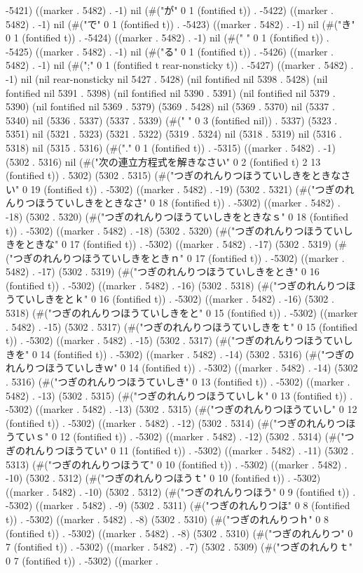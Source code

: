 -5421) ((marker . 5482) . -1) nil (#("が" 0 1 (fontified t)) . -5422) ((marker . 5482) . -1) nil (#("で" 0 1 (fontified t)) . -5423) ((marker . 5482) . -1) nil (#("き" 0 1 (fontified t)) . -5424) ((marker . 5482) . -1) nil (#("
" 0 1 (fontified t)) . -5425) ((marker . 5482) . -1) nil (#("る" 0 1 (fontified t)) . -5426) ((marker . 5482) . -1) nil (#(";" 0 1 (fontified t rear-nonsticky t)) . -5427) ((marker . 5482) . -1) nil (nil rear-nonsticky nil 5427 . 5428) (nil fontified nil 5398 . 5428) (nil fontified nil 5391 . 5398) (nil fontified nil 5390 . 5391) (nil fontified nil 5379 . 5390) (nil fontified nil 5369 . 5379) (5369 . 5428) nil (5369 . 5370) nil (5337 . 5340) nil (5336 . 5337) (5337 . 5339) (#("   " 0 3 (fontified nil)) . 5337) (5323 . 5351) nil (5321 . 5323) (5321 . 5322) (5319 . 5324) nil (5318 . 5319) nil (5316 . 5318) nil (5315 . 5316) (#("." 0 1 (fontified t)) . -5315) ((marker . 5482) . -1) (5302 . 5316) nil (#("次の連立方程式を解きなさい" 0 2 (fontified t) 2 13 (fontified t)) . 5302) (5302 . 5315) (#("つぎのれんりつほうていしきをときなさい" 0 19 (fontified t)) . -5302) ((marker . 5482) . -19) (5302 . 5321) (#("つぎのれんりつほうていしきをときなさ" 0 18 (fontified t)) . -5302) ((marker . 5482) . -18) (5302 . 5320) (#("つぎのれんりつほうていしきをときなｓ" 0 18 (fontified t)) . -5302) ((marker . 5482) . -18) (5302 . 5320) (#("つぎのれんりつほうていしきをときな" 0 17 (fontified t)) . -5302) ((marker . 5482) . -17) (5302 . 5319) (#("つぎのれんりつほうていしきをときｎ" 0 17 (fontified t)) . -5302) ((marker . 5482) . -17) (5302 . 5319) (#("つぎのれんりつほうていしきをとき" 0 16 (fontified t)) . -5302) ((marker . 5482) . -16) (5302 . 5318) (#("つぎのれんりつほうていしきをとｋ" 0 16 (fontified t)) . -5302) ((marker . 5482) . -16) (5302 . 5318) (#("つぎのれんりつほうていしきをと" 0 15 (fontified t)) . -5302) ((marker . 5482) . -15) (5302 . 5317) (#("つぎのれんりつほうていしきをｔ" 0 15 (fontified t)) . -5302) ((marker . 5482) . -15) (5302 . 5317) (#("つぎのれんりつほうていしきを" 0 14 (fontified t)) . -5302) ((marker . 5482) . -14) (5302 . 5316) (#("つぎのれんりつほうていしきｗ" 0 14 (fontified t)) . -5302) ((marker . 5482) . -14) (5302 . 5316) (#("つぎのれんりつほうていしき" 0 13 (fontified t)) . -5302) ((marker . 5482) . -13) (5302 . 5315) (#("つぎのれんりつほうていしｋ" 0 13 (fontified t)) . -5302) ((marker . 5482) . -13) (5302 . 5315) (#("つぎのれんりつほうていし" 0 12 (fontified t)) . -5302) ((marker . 5482) . -12) (5302 . 5314) (#("つぎのれんりつほうていｓ" 0 12 (fontified t)) . -5302) ((marker . 5482) . -12) (5302 . 5314) (#("つぎのれんりつほうてい" 0 11 (fontified t)) . -5302) ((marker . 5482) . -11) (5302 . 5313) (#("つぎのれんりつほうて" 0 10 (fontified t)) . -5302) ((marker . 5482) . -10) (5302 . 5312) (#("つぎのれんりつほうｔ" 0 10 (fontified t)) . -5302) ((marker . 5482) . -10) (5302 . 5312) (#("つぎのれんりつほう" 0 9 (fontified t)) . -5302) ((marker . 5482) . -9) (5302 . 5311) (#("つぎのれんりつほ" 0 8 (fontified t)) . -5302) ((marker . 5482) . -8) (5302 . 5310) (#("つぎのれんりつｈ" 0 8 (fontified t)) . -5302) ((marker . 5482) . -8) (5302 . 5310) (#("つぎのれんりつ" 0 7 (fontified t)) . -5302) ((marker . 5482) . -7) (5302 . 5309) (#("つぎのれんりｔ" 0 7 (fontified t)) . -5302) ((marker . 